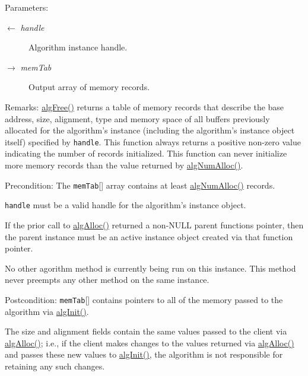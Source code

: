 \begin{Desc}
\item[Parameters:]
\begin{description}
\item[\mbox{$\leftarrow$} {\em handle}]Algorithm instance handle. \item[\mbox{$\rightarrow$} {\em mem\-Tab}]Output array of memory records.\end{description}
\end{Desc}
\begin{Desc}
\item[Remarks:]\hyperlink{struct_i_a_l_g___fxns_c6f87b240d96486e3e88e80b95046ade}{alg\-Free()} returns a table of memory records that describe the base address, size, alignment, type and memory space of all buffers previously allocated for the algorithm's instance (including the algorithm's instance object itself) specified by {\tt handle}. This function always returns a positive non-zero value indicating the number of records initialized. This function can never initialize more memory records than the value returned by \hyperlink{struct_i_a_l_g___fxns_098c1ca275465bb4acc1d3d0cf060160}{alg\-Num\-Alloc()}.\end{Desc}
\begin{Desc}
\item[Precondition:]The {\tt mem\-Tab}\mbox{[}\mbox{]} array contains at least \hyperlink{struct_i_a_l_g___fxns_098c1ca275465bb4acc1d3d0cf060160}{alg\-Num\-Alloc()} records.

{\tt handle} must be a valid handle for the algorithm's instance object.

If the prior call to \hyperlink{struct_i_a_l_g___fxns_1640ba8f4033af1ce3887283c7a12746}{alg\-Alloc()} returned a non-NULL parent functions pointer, then the parent instance must be an active instance object created via that function pointer.

No other agorithm method is currently being run on this instance. This method never preempts any other method on the same instance.\end{Desc}
\begin{Desc}
\item[Postcondition:]{\tt mem\-Tab}\mbox{[}\mbox{]} contains pointers to all of the memory passed to the algorithm via \hyperlink{struct_i_a_l_g___fxns_94eca7c58cceb112eccd970a6cf3f569}{alg\-Init()}.

The size and alignment fields contain the same values passed to the client via \hyperlink{struct_i_a_l_g___fxns_1640ba8f4033af1ce3887283c7a12746}{alg\-Alloc()}; i.e., if the client makes changes to the values returned via \hyperlink{struct_i_a_l_g___fxns_1640ba8f4033af1ce3887283c7a12746}{alg\-Alloc()} and passes these new values to \hyperlink{struct_i_a_l_g___fxns_94eca7c58cceb112eccd970a6cf3f569}{alg\-Init()}, the algorithm is not responsible for retaining any such changes.\end{Desc}
